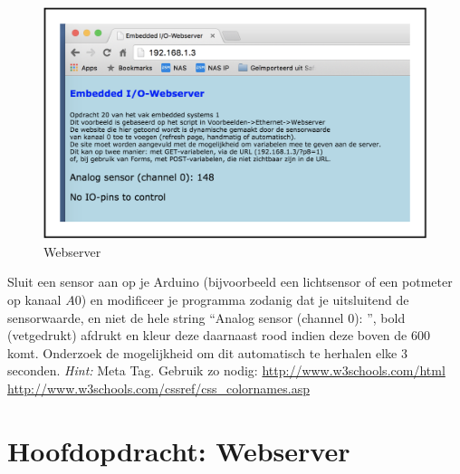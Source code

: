 \begin{figure}[h!]
\centering\includegraphics[scale=0.25]{Pictures/chapter01/webserver.png}
\caption{Webserver}
\label{fig:webserver} %
\end{figure}

\begin{exercise}
Sluit een sensor aan op je Arduino (bijvoorbeeld een lichtsensor of een potmeter op kanaal $A0$) en modificeer je programma zodanig dat je uitsluitend de sensorwaarde, en niet de hele string “Analog sensor (channel 0): ”, bold (vetgedrukt) afdrukt en kleur deze daarnaast rood indien deze boven de $600$ komt. Onderzoek de mogelijkheid om dit automatisch te herhalen elke 3 seconden. \textit{Hint:} Meta Tag.\newline
Gebruik zo nodig: \url{http://www.w3schools.com/html http://www.w3schools.com/cssref/css_colornames.asp}
\end{exercise}

\section{Hoofdopdracht: Webserver}

